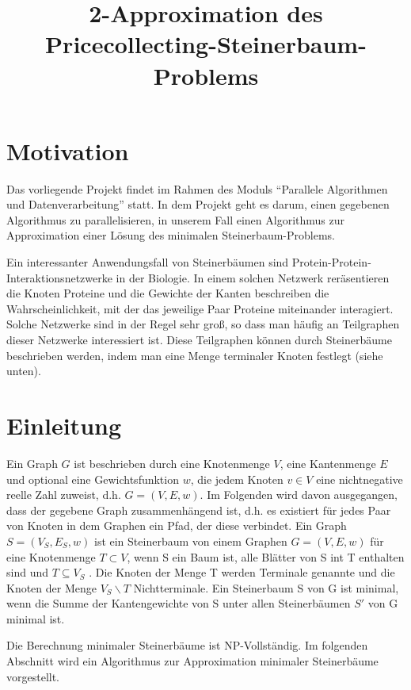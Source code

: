 \documentclass[a4paper,10pt]{article}
\title{2-Approximation des Pricecollecting-Steinerbaum-Problems}
\author{}
\begin{document}
\maketitle

\section{Motivation}
Das vorliegende Projekt findet im Rahmen des Moduls ``Parallele Algorithmen und Datenverarbeitung'' statt. In dem Projekt geht es darum, einen gegebenen
Algorithmus zu parallelisieren, in unserem Fall einen Algorithmus zur Approximation einer Lösung des minimalen Steinerbaum-Problems.

Ein interessanter Anwendungsfall von Steinerbäumen sind Protein-Protein-Interaktionsnetzwerke in der Biologie. In einem solchen Netzwerk
reräsentieren die Knoten Proteine und die Gewichte der Kanten beschreiben die Wahrscheinlichkeit, mit der das jeweilige Paar Proteine miteinander
interagiert. Solche Netzwerke sind in der Regel sehr groß, so dass man häufig an Teilgraphen dieser Netzwerke interessiert ist.
Diese Teilgraphen können durch Steinerbäume beschrieben werden, indem man eine Menge terminaler Knoten festlegt (siehe unten).


\section{Einleitung}
Ein Graph $G$ ist beschrieben durch eine Knotenmenge $V$, eine Kantenmenge $E$ und optional eine Gewichtsfunktion $w$, die jedem Knoten $v \in V$
eine nichtnegative reelle Zahl zuweist, d.h. $G = (V,E,w)$. Im Folgenden wird davon ausgegangen, dass der gegebene Graph zusammenhängend ist,
d.h. es existiert für jedes Paar von Knoten in dem Graphen ein Pfad, der diese verbindet.
Ein Graph $S = (V_S, E_S, w)$ ist ein Steinerbaum von einem Graphen $G = (V, E, w)$ für eine Knotenmenge $T \subset V$, wenn S ein Baum ist, alle Blätter
von S int T enthalten sind und $T \subseteq V_S$ \cite{steinerProblem}. Die Knoten der Menge T werden Terminale genannte und die Knoten der Menge
$V_S \backslash T$ Nichtterminale. Ein Steinerbaum S von G ist minimal, wenn die Summe der Kantengewichte von S
unter allen Steinerbäumen $S'$ von G minimal ist.

Die Berechnung minimaler Steinerbäume ist NP-Vollständig. Im folgenden Abschnitt wird ein Algorithmus zur Approximation minimaler Steinerbäume vorgestellt.
\end{document}
